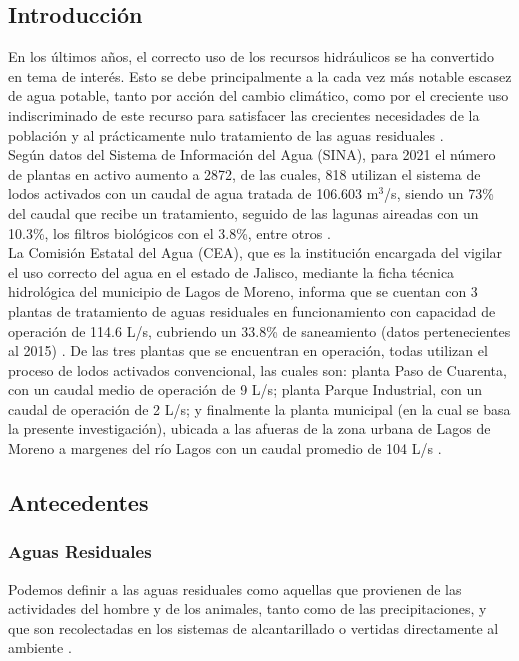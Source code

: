 \subsection*{Introducción}
En los últimos años, el correcto uso de los recursos hidráulicos se ha convertido en tema de interés. Esto se debe principalmente a la cada vez más notable escasez de agua potable, tanto por acción del cambio climático, como por el creciente uso indiscriminado de este recurso para satisfacer las crecientes necesidades de la población y al prácticamente nulo tratamiento de las aguas residuales \emph{\citep{informeods2021, aa2030}}.\\
Según datos del Sistema de Información del Agua (SINA), para 2021 el número de plantas en activo aumento a 2872, de las cuales, 818 utilizan el sistema de lodos activados con un caudal de agua tratada de 106.603 m$^{3}$/s, siendo un 73\% del caudal que recibe un tratamiento, seguido de las lagunas aireadas con un 10.3\%, los filtros biológicos con el 3.8\%, entre otros \emph{\citep{SINA}}.\\
La Comisión Estatal del Agua (CEA), que es la institución encargada del vigilar el uso correcto del agua en el estado de Jalisco, mediante la ficha técnica hidrológica del municipio de Lagos de Moreno, informa que se cuentan con 3 plantas de tratamiento de aguas residuales  en funcionamiento con capacidad de operación de 114.6 L/s, cubriendo un 33.8\% de saneamiento (datos pertenecientes al 2015) \emph{\citep{fichalagos}}. De las tres plantas que se encuentran en operación, todas utilizan el proceso de lodos activados convencional, las cuales son: planta Paso de Cuarenta, con un caudal medio de operación de 9 L/s; planta Parque Industrial, con un caudal de operación de 2 L/s; y finalmente la planta municipal (en la cual se basa la presente investigación), ubicada a las afueras de la zona urbana de Lagos de Moreno a margenes del río Lagos con un caudal promedio de 104 L/s \emph{\citep{fichalagos}}.
\subsection*{Antecedentes}
\subsubsection*{Aguas Residuales}
Podemos definir a las aguas residuales como aquellas que provienen de las actividades del hombre y de los animales, tanto como de las precipitaciones, y que son recolectadas en los sistemas de alcantarillado o vertidas directamente al ambiente \emph{\citep{carreno17}}.
